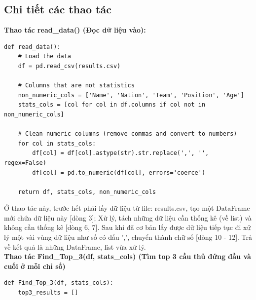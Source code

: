 \documentclass[12pt]{report}
\begin{document}
{\subsection{Chi tiết các thao tác}
\textbf* {Thao tác read\_data() (Đọc dữ liệu vào):}
\begin{lstlisting}
def read_data():
    # Load the data
    df = pd.read_csv(results.csv)

    # Columns that are not statistics
    non_numeric_cols = ['Name', 'Nation', 'Team', 'Position', 'Age']
    stats_cols = [col for col in df.columns if col not in non_numeric_cols]

    # Clean numeric columns (remove commas and convert to numbers)
    for col in stats_cols:
        df[col] = df[col].astype(str).str.replace(',', '', regex=False)
        df[col] = pd.to_numeric(df[col], errors='coerce')

    return df, stats_cols, non_numeric_cols
\end{lstlisting}

Ở thao tác này, trước hết phải lấy dữ liệu từ file: results.csv, tạo một DataFrame mới chứa dữ liệu này [dòng 3]; Xử lý, tách những dữ liệu cần thống kê (về list) và không cần thống kê [dòng 6, 7]. Sau khi đã cơ bản lấy được dữ liệu tiếp tục đi xử lý một vài vùng dữ liệu như số có dấu ',', chuyển thành chữ số [dòng 10 - 12]. Trả về kết quả là những DataFrame, list vừa xử lý.\\

\textbf* {Thao tác Find\_Top\_3(df, stats\_cols) (Tìm top 3 cầu thủ đứng đầu và cuối ở mỗi chỉ số)}
\begin{lstlisting}
def Find_Top_3(df, stats_cols):
    top3_results = []


\end{lstlisting}}
\end{document}
